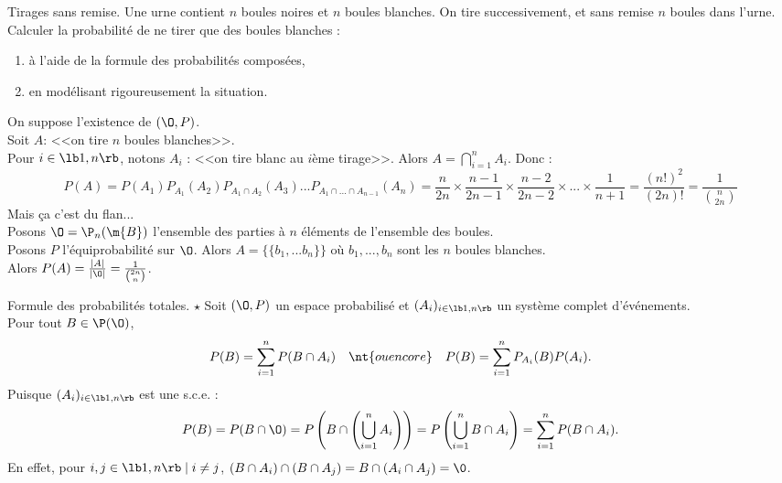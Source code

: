 \documentclass[11pt]{article}
\begin{document}
\begin{ex}{Tirages sans remise.}{}
    Une urne contient $n$ boules noires et $n$ boules blanches. On tire successivement, et sans remise $n$ boules dans l'urne. Calculer la probabilité de ne tirer que des boules blanches :
    \begin{enumerate}[topsep=0pt,itemsep=-0.9 ex]
        \item à l'aide de la formule des probabilités composées,
        \item en modélisant rigoureusement la situation.
    \end{enumerate}
    \tcblower
    On suppose l'existence de $(\O,P)$.\\
    Soit $A$: <<on tire $n$ boules blanches>>.\\
     Pour $i\in\lb1,n\rb$, notons $A_i$ : <<on tire blanc au $i$ème tirage>>. Alors $A=\bigcap_{i=1}^n A_i$. Donc :
    \begin{equation*}
        P(A)=P(A_1)P_{A_1}(A_2)P_{A_1\cap A_2}(A_3)...P_{A_1\cap...\cap A_{n-1}}(A_n)=\frac{n}{2n}\times\frac{n-1}{2n-1}\times\frac{n-2}{2n-2}\times...\times\frac{1}{n+1}=\frac{(n!)^2}{(2n)!}=\frac{1}{\binom{n}{2n}}
    \end{equation*}
    Mais ça c'est du flan...\\
     Posons $\O=\P_n(\m{B})$ l'ensemble des parties à $n$ éléments de l'ensemble des boules.\\
    Posons $P$ l'équiprobabilité sur $\O$. Alors $A=\{\{b_1,...b_n\}\}$ où $b_1,...,b_n$ sont les $n$ boules blanches.\\
    Alors $P(A)=\frac{|A|}{|\O|}=\frac{1}{\binom{2n}{n}}$.
\end{ex}

\begin{prop}{Formule des probabilités totales. $\star$}{}
    Soit $(\O,P)$ un espace probabilisé et $(A_i)_{i\in\lb1,n\rb}$ un système complet d'événements.\\
    Pour tout $B\in\P(\O)$,
    \begin{equation*}
        P(B)=\sum_{i=1}^nP(B\cap A_i) \quad \nt{ ou encore} \quad P(B)=\sum_{i=1}^nP_{A_i}(B)P(A_i).
    \end{equation*}
    \tcblower
    Puisque $(A_i)_{i\in\lb1,n\rb}$ est une s.c.e. :
    \begin{equation*}
        P(B)=P(B\cap\O)=P\left(B\cap\left(\bigcup_{i=1}^nA_i\right)\right)=P\left(\bigcup_{i=1}^nB\cap A_i\right)=\sum_{i=1}^nP(B\cap A_i).
    \end{equation*}
    En effet, pour $i,j\in\lb1,n\rb \mid i\neq j$, $(B\cap A_i)\cap(B\cap A_j)=B\cap(A_i\cap A_j)=\0$.
\end{prop}
\end{document}
